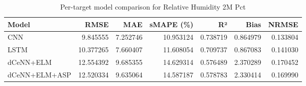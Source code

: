 \begin{table}
\caption{Per-target model comparison for Relative Humidity 2M Pct}
\begin{tabular}{lrrrrrr}
\toprule
Model & RMSE & MAE & sMAPE (\%) & R² & Bias & NRMSE \\
\midrule
CNN & 9.845555 & 7.252746 & 10.953124 & 0.738719 & 0.864979 & 0.133804 \\
LSTM & 10.377265 & 7.660407 & 11.608054 & 0.709737 & 0.867083 & 0.141030 \\
dCeNN+ELM & 12.554392 & 9.685355 & 14.629314 & 0.576489 & 2.370289 & 0.170452 \\
dCeNN+ELM+ASP & 12.520334 & 9.635064 & 14.587187 & 0.578783 & 2.330414 & 0.169990 \\
\bottomrule
\end{tabular}
\end{table}
